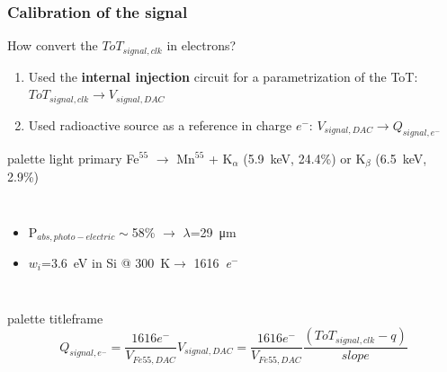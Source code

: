     \begin{frame}
        \frametitle{Calibration of the signal}
        How convert the $ToT_{signal, clk}$ in electrons?
        \smallskip
        \pause
        \begin{enumerate}
            \item Used the \textbf{internal injection} circuit for a parametrization of the ToT: $ToT_{signal,clk}\rightarrow V_{signal, DAC}$
            \item Used radioactive source as a reference in charge $e^-$: $V_{signal, DAC}\rightarrow Q_{signal, e^-}$
        \end{enumerate}
        \medskip
        \pause
        \begin{beamercolorbox}[sep=0em,wd=0.95\textwidth,ht=1.5ex, dp=0.1ex, rounded=true, center]{palette light primary}
            Fe$^{55}$ $\rightarrow$ Mn$^{55}$ + K$_\alpha$ (\SI{5.9}{keV}, 24.4\%) or K$_\beta$ (\SI{6.5}{keV}, 2.9\%)
        \end{beamercolorbox}
        \begin{columns}
            \begin{itemize}
                \item P$_{abs, photo-electric}\sim$58\% $\rightarrow$ $\lambda$=\SI{29}{\um}
                \item $w_i$=\SI{3.6}{eV} in Si @ \SI{300}{\kelvin}$\rightarrow$ \SI{1616}{\elementarycharge}$^-$
            \end{itemize}
        \end{columns}
        \medskip
        \pause
        \begin{beamercolorbox}[rounded=true, center]{palette titleframe}
        \begin{equation*}
            Q_{signal,e^-} = \frac{1616e^-}{V_{Fe55,DAC}}V_{signal,DAC}=\frac{1616e^-}{V_{Fe55,DAC}}\frac{(ToT_{signal,clk}-q)}{slope}
        \end{equation*}
    \end{beamercolorbox}
    \end{frame}  



